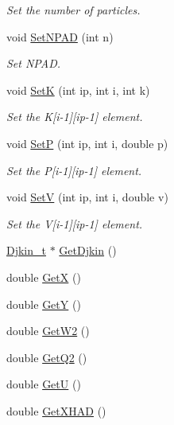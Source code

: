 \begin{DoxyCompactItemize}
\begin{DoxyCompactList}\small\item\em Set the number of particles. \end{DoxyCompactList}\item 
void \hyperlink{class_t_djangoh_a0ed7bb7e7433a6385b5838ce519168a2}{Set\+N\+P\+AD} (int n)
\begin{DoxyCompactList}\small\item\em Set N\+P\+AD. \end{DoxyCompactList}\item 
void \hyperlink{class_t_djangoh_a045a7fabe350589453e240bff98ca54b}{SetK} (int ip, int i, int k)
\begin{DoxyCompactList}\small\item\em Set the K\mbox{[}i-\/1\mbox{]}\mbox{[}ip-\/1\mbox{]} element. \end{DoxyCompactList}\item 
void \hyperlink{class_t_djangoh_aa9cfa62ac6bf01a7f5214cc62cdae34c}{SetP} (int ip, int i, double p)
\begin{DoxyCompactList}\small\item\em Set the P\mbox{[}i-\/1\mbox{]}\mbox{[}ip-\/1\mbox{]} element. \end{DoxyCompactList}\item 
void \hyperlink{class_t_djangoh_a472e228f316f1473c940dfa37c22637c}{SetV} (int ip, int i, double v)
\begin{DoxyCompactList}\small\item\em Set the V\mbox{[}i-\/1\mbox{]}\mbox{[}ip-\/1\mbox{]} element. \end{DoxyCompactList}\item 
\hyperlink{struct_djkin__t}{Djkin\+\_\+t} $\ast$ \hyperlink{class_t_djangoh_a4f5a22f9af97e7c84660c94cd354f780}{Get\+Djkin} ()
\item 
double \hyperlink{class_t_djangoh_aa2d4a28a97826cf32b9d623c581da9de}{GetX} ()
\item 
double \hyperlink{class_t_djangoh_aee089d5536e8acb68236f9546e4f06e2}{GetY} ()
\item 
double \hyperlink{class_t_djangoh_a94c252e7c5375e9641ad5ea048098c06}{Get\+W2} ()
\item 
double \hyperlink{class_t_djangoh_afce6f0bfed90b20eb0f9310ae107291d}{Get\+Q2} ()
\item 
double \hyperlink{class_t_djangoh_a6e69090ac8581a1be96cac889cf5292b}{GetU} ()
\item 
double \hyperlink{class_t_djangoh_a64b580157191cf32f0b3ba4047b69bdf}{Get\+X\+H\+AD} ()

\end{DoxyCompactItemize}

